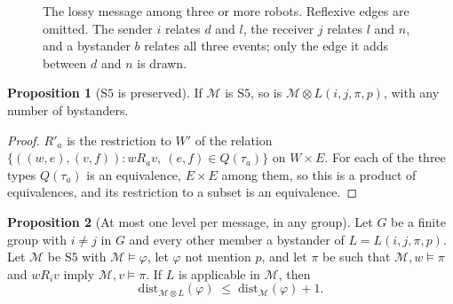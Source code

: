 \documentclass[11pt,a4paper]{article}
\theoremstyle{definition}
\newtheorem{proposition}{Proposition}
\newcommand{\Mod}{\mathcal{M}}
\newcommand{\prd}{\otimes}
\newcommand{\dist}{\mathrm{dist}}
\begin{document}
\begin{figure}[H]
\centering
{}
\caption{The lossy message among three or more robots. Reflexive edges are
omitted. The sender $i$ relates $d$ and $l$, the receiver $j$ relates $l$ and
$n$, and a bystander $b$ relates all three events; only the edge it adds between
$d$ and $n$ is drawn.}
\label{fig:lossy}
\end{figure}

\begin{proposition}[$\mathrm{S5}$ is preserved]
\label{prop:s5}
If $\Mod$ is $\mathrm{S5}$, so is $\Mod \prd L(i,j,\pi,p)$, with any number of
bystanders.
\end{proposition}

\begin{proof}
$R'_a$ is the restriction to $W'$ of the relation
$\{((w,e),(v,f)) : w R_a v,\ (e,f) \in Q(\tau_a)\}$ on $W \times E$. For each of
the three types $Q(\tau_a)$ is an equivalence, $E \times E$ among them, so
this is a product of equivalences, and its restriction to a subset is an
equivalence.
\end{proof}

\begin{proposition}[At most one level per message, in any group]
\label{prop:onelevel}
Let $G$ be a finite group with $i \neq j$ in $G$ and every other member a
bystander of $L = L(i,j,\pi,p)$. Let $\Mod$ be $\mathrm{S5}$ with
$\Mod \models \varphi$, let $\varphi$ not mention $p$, and let $\pi$ be such that
$\Mod, w \models \pi$ and $w R_i v$ imply $\Mod, v \models \pi$. If $L$ is
applicable in $\Mod$, then
\[
  \dist_{\Mod \prd L}(\varphi) \;\leq\; \dist_\Mod(\varphi) + 1 .
\]
\end{proposition}
\end{document}
